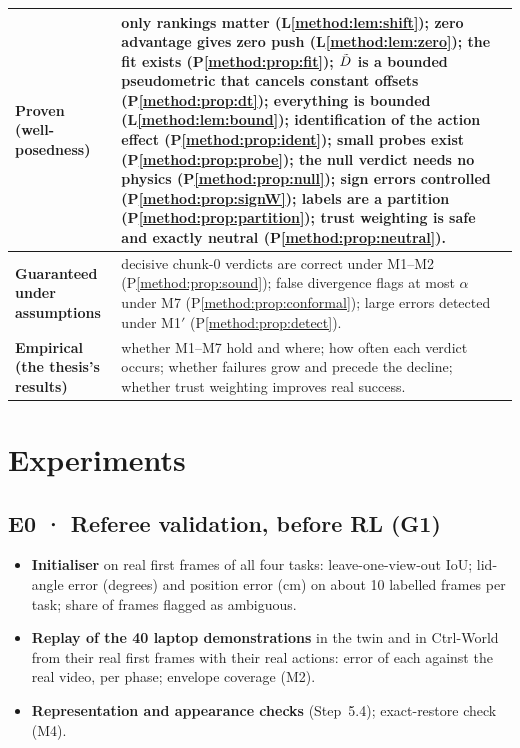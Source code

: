 \begin{center}\small
\begin{tabularx}{\linewidth}{@{}>{\raggedright\arraybackslash}p{4.2cm}>{\raggedright\arraybackslash}X@{}}
\toprule
\textbf{Proven (well-posedness)} & only rankings matter (L\ref{method:lem:shift}); zero advantage gives zero push (L\ref{method:lem:zero}); the fit exists (P\ref{method:prop:fit}); $\tilde D$ is a bounded pseudometric that cancels constant offsets (P\ref{method:prop:dt}); everything is bounded (L\ref{method:lem:bound}); identification of the action effect (P\ref{method:prop:ident}); small probes exist (P\ref{method:prop:probe}); the null verdict needs no physics (P\ref{method:prop:null}); sign errors controlled (P\ref{method:prop:signW}); labels are a partition (P\ref{method:prop:partition}); trust weighting is safe and exactly neutral (P\ref{method:prop:neutral}).\\
\midrule
\textbf{Guaranteed under assumptions} & decisive chunk-0 verdicts are correct under M1--M2 (P\ref{method:prop:sound}); false divergence flags at most $\alpha$ under M7 (P\ref{method:prop:conformal}); large errors detected under M1$'$ (P\ref{method:prop:detect}).\\
\midrule
\textbf{Empirical (the thesis's results)} & whether M1--M7 hold and where; how often each verdict occurs; whether failures grow and precede the decline; whether trust weighting improves real success.\\
\bottomrule
\end{tabularx}
\end{center}

\section{Experiments}\label{method:sec:experiments}

\subsection{E0 · Referee validation, before RL (G1)}
\begin{itemize}
\item \textbf{Initialiser} on real first frames of all four tasks: leave-one-view-out IoU; lid-angle error (degrees) and position error (cm) on about 10 labelled frames per task; share of frames flagged as ambiguous.
\item \textbf{Replay of the 40 laptop demonstrations} in the twin and in Ctrl-World from their real first frames with their real actions: error of each against the real video, per phase; envelope coverage (M2).
\item \textbf{Representation and appearance checks} (Step~5.4); exact-restore check (M4).
\end{itemize}

